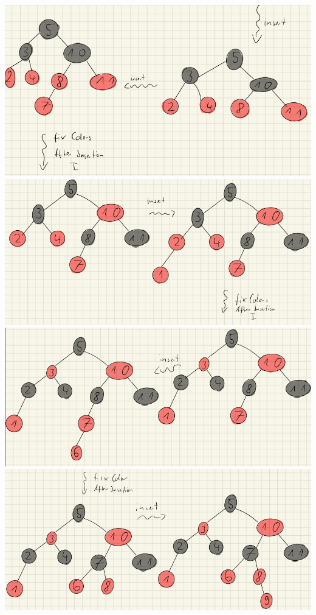 \documentclass{article}
\begin{document}
\bigskip
\includegraphics[scale=0.5]{ h1_a7 } \\
\bigskip
\includegraphics[scale=0.5]{ h1_a8 } \\
\bigskip
\includegraphics[scale=0.5]{ h1_a9 } \\
\bigskip
\includegraphics[scale=0.5]{ h1_a10 } \\
\end{document}
